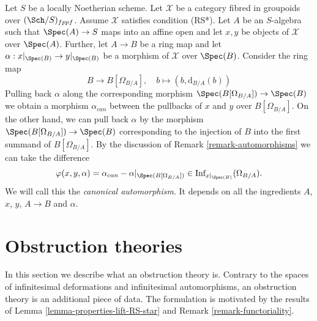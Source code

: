 \begin{remark}
\label{remark-canonical-isomorphism}
Let $S$ be a locally Noetherian scheme. Let $\mathcal{X}$ be a category
fibred in groupoids over $(\Sch/S)_{fppf}$. Assume $\mathcal{X}$ satisfies
condition (RS*). Let $A$ be an $S$-algebra such that
$\Spec(A) \to S$ maps into an affine open and let $x, y$ be objects of
$\mathcal{X}$ over $\Spec(A)$. Further, let $A \to B$ be a ring map and
let $\alpha : x|_{\Spec(B)} \to y|_{\Spec(B)}$ be a morphism of
$\mathcal{X}$ over $\Spec(B)$. Consider the ring map
$$
B \longrightarrow B[\Omega_{B/A}],
\quad
b \longmapsto (b, \text{d}_{B/A}(b))
$$
Pulling back $\alpha$ along the corresponding morphism
$\Spec(B[\Omega_{B/A}]) \to \Spec(B)$ we obtain a
morphism $\alpha_{can}$ between the pullbacks of $x$ and $y$ over
$B[\Omega_{B/A}]$. On the other hand, we can pull back $\alpha$
by the morphism $\Spec(B[\Omega_{B/A}]) \to \Spec(B)$ corresponding
to the injection of $B$ into the first summand of $B[\Omega_{B/A}]$.
By the discussion of Remark \ref{remark-automorphisms}
we can take the difference
$$
\varphi(x, y, \alpha) = \alpha_{can} - \alpha|_{\Spec(B[\Omega_{B/A}])} \in
\text{Inf}_{x|_{\Spec(B)}}(\Omega_{B/A}).
$$
We will call this the {\it canonical automorphism}. It depends
on all the ingredients $A$, $x$, $y$, $A \to B$ and $\alpha$.
\end{remark}





\section{Obstruction theories}
\label{section-obstruction-theory}

\noindent
In this section we describe what an obstruction theory is.
Contrary to the spaces of infinitesimal deformations and infinitesimal
automorphisms, an obstruction theory is an additional piece of data.
The formulation is motivated by the results of
Lemma \ref{lemma-properties-lift-RS-star}
and Remark \ref{remark-functoriality}.

